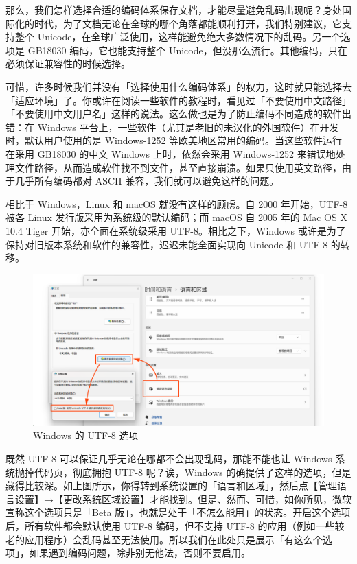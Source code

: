那么，我们怎样选择合适的编码体系保存文档，才能尽量避免乱码出现呢？身处国际化的时代，为了文档无论在全球的哪个角落都能顺利打开，我们特别建议，它支持整个 Unicode，在全球广泛使用，这样能避免绝大多数情况下的乱码。另一个选项是 GB18030 编码，它也能支持整个 Unicode，但没那么流行。其他编码，只在必须保证兼容性的时候选择。

可惜，许多时候我们并没有「选择使用什么编码体系」的权力，这时就只能选择去「适应环境」了。你或许在阅读一些软件的教程时，看见过「不要使用中文路径」「不要使用中文用户名」这样的说法。这么做也是为了防止编码不同造成的软件出错：在 Windows 平台上，一些软件（尤其是老旧的未汉化的外国软件）在开发时，默认用户使用的是 Windows-1252 等欧美地区常用的编码。当这些软件运行在采用 GB18030 的中文 Windows 上时，依然会采用 Windows-1252 来错误地处理文件路径，从而造成软件找不到文件，甚至直接崩溃。如果只使用英文路径，由于几乎所有编码都对 ASCII 兼容，我们就可以避免这样的问题。

\begin{note}
  相比于 Windows，Linux 和 macOS 就没有这样的顾虑。自 2000 年开始，UTF-8 被各 Linux 发行版采用为系统级的默认编码；而 macOS 自 2005 年的 Mac OS X 10.4 Tiger 开始，亦全面在系统级采用 UTF-8。相比之下，Windows 或许是为了保持对旧版本系统和软件的兼容性，迟迟未能全面实现向 Unicode 和 UTF-8 的转移。
\end{note}

\begin{figure}[htb!]
  \centering
  \includegraphics[width=.75\textwidth]{assets/advanced/Utf8OnWin.png}
  \caption{Windows 的 UTF-8 选项}
  \label{fig:Utf8OnWin}
\end{figure}

既然 UTF-8 可以保证几乎无论在哪都不会出现乱码，那能不能也让 Windows 系统抛掉代码页，彻底拥抱 UTF-8 呢？诶，Windows 的确提供了这样的选项，但是藏得比较深。如上图所示，你得转到系统设置的「语言和区域」，然后点【管理语言设置】→【更改系统区域设置】才能找到。但是、然而、可惜，如你所见，微软宣称这个选项只是「Beta 版」，也就是处于「不怎么能用」的状态。开启这个选项后，所有软件都会默认使用 UTF-8 编码，但不支持 UTF-8 的应用（例如一些较老的应用程序）会乱码甚至无法使用。所以我们在此处只是展示「有这么个选项」，如果遇到编码问题，除非别无他法，否则不要启用。

